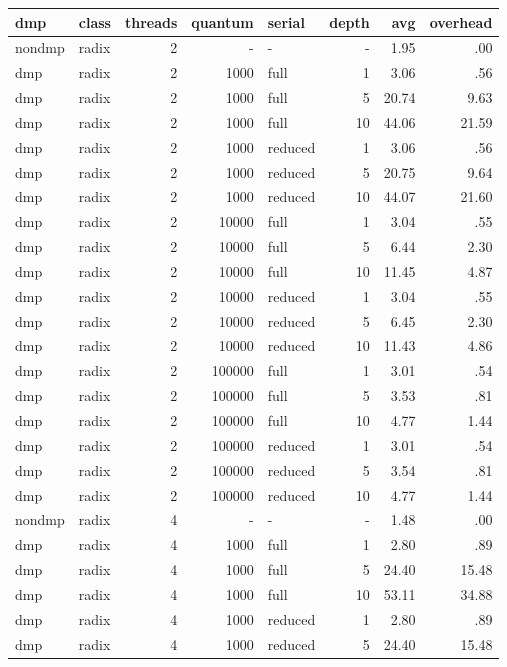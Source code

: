 \begin{center}
\begin{small}
\begin{longtable}{llrrlrrr}
\hline
dmp & class & threads & quantum & serial & depth & avg & overhead\\
\hline
nondmp & radix & 2 & - & - & - & 1.95 & .00\\
dmp & radix & 2 & 1000 & full & 1 & 3.06 & .56\\
dmp & radix & 2 & 1000 & full & 5 & 20.74 & 9.63\\
dmp & radix & 2 & 1000 & full & 10 & 44.06 & 21.59\\
dmp & radix & 2 & 1000 & reduced & 1 & 3.06 & .56\\
dmp & radix & 2 & 1000 & reduced & 5 & 20.75 & 9.64\\
dmp & radix & 2 & 1000 & reduced & 10 & 44.07 & 21.60\\
dmp & radix & 2 & 10000 & full & 1 & 3.04 & .55\\
dmp & radix & 2 & 10000 & full & 5 & 6.44 & 2.30\\
dmp & radix & 2 & 10000 & full & 10 & 11.45 & 4.87\\
dmp & radix & 2 & 10000 & reduced & 1 & 3.04 & .55\\
dmp & radix & 2 & 10000 & reduced & 5 & 6.45 & 2.30\\
dmp & radix & 2 & 10000 & reduced & 10 & 11.43 & 4.86\\
dmp & radix & 2 & 100000 & full & 1 & 3.01 & .54\\
dmp & radix & 2 & 100000 & full & 5 & 3.53 & .81\\
dmp & radix & 2 & 100000 & full & 10 & 4.77 & 1.44\\
dmp & radix & 2 & 100000 & reduced & 1 & 3.01 & .54\\
dmp & radix & 2 & 100000 & reduced & 5 & 3.54 & .81\\
dmp & radix & 2 & 100000 & reduced & 10 & 4.77 & 1.44\\
\hline
nondmp & radix & 4 & - & - & - & 1.48 & .00\\
dmp & radix & 4 & 1000 & full & 1 & 2.80 & .89\\
dmp & radix & 4 & 1000 & full & 5 & 24.40 & 15.48\\
dmp & radix & 4 & 1000 & full & 10 & 53.11 & 34.88\\
dmp & radix & 4 & 1000 & reduced & 1 & 2.80 & .89\\
dmp & radix & 4 & 1000 & reduced & 5 & 24.40 & 15.48\\

\end{longtable}
\end{small}
\end{center}
